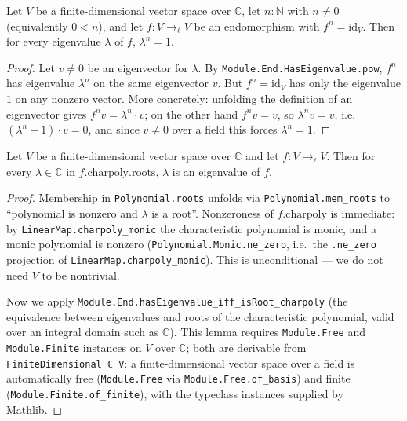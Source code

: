 \begin{lemma}
  \label{lem:eig-root-of-unity}
  \leanok
  Let $V$ be a finite-dimensional vector space over $\mathbb{C}$, let $n : \mathbb{N}$ with $n \neq 0$ (equivalently $0 < n$), and let $f : V \to_{\ell} V$ be an endomorphism with $f^n = \mathrm{id}_V$.  Then for every eigenvalue $\lambda$ of $f$, $\lambda^n = 1$.
\end{lemma}
\begin{proof}
  Let $v \neq 0$ be an eigenvector for $\lambda$.  By \verb|Module.End.HasEigenvalue.pow|, $f^n$ has eigenvalue $\lambda^n$ on the same eigenvector $v$.  But $f^n = \mathrm{id}_V$ has only the eigenvalue $1$ on any nonzero vector.  More concretely: unfolding the definition of an eigenvector gives $f^n v = \lambda^n \cdot v$; on the other hand $f^n v = v$, so $\lambda^n v = v$, i.e.\ $(\lambda^n - 1) \cdot v = 0$, and since $v \neq 0$ over a field this forces $\lambda^n = 1$.
\end{proof}

\begin{lemma}
  \label{lem:charpoly-roots-are-eigenvalues}
  \leanok
  Let $V$ be a finite-dimensional vector space over $\mathbb{C}$ and let $f : V \to_{\ell} V$.  Then for every $\lambda \in \mathbb{C}$ in $f.\mathrm{charpoly}.\mathrm{roots}$, $\lambda$ is an eigenvalue of $f$.
\end{lemma}
\begin{proof}
  Membership in \verb|Polynomial.roots| unfolds via \verb|Polynomial.mem_roots| to ``polynomial is nonzero and $\lambda$ is a root''.  Nonzeroness of $f.\mathrm{charpoly}$ is immediate: by \verb|LinearMap.charpoly_monic| the characteristic polynomial is monic, and a monic polynomial is nonzero (\verb|Polynomial.Monic.ne_zero|, i.e.\ the \verb|.ne_zero| projection of \verb|LinearMap.charpoly_monic|).  This is unconditional --- we do not need $V$ to be nontrivial.

  Now we apply \verb|Module.End.hasEigenvalue_iff_isRoot_charpoly| (the equivalence between eigenvalues and roots of the characteristic polynomial, valid over an integral domain such as $\mathbb{C}$).  This lemma requires \verb|Module.Free| and \verb|Module.Finite| instances on $V$ over $\mathbb{C}$; both are derivable from \verb|FiniteDimensional ℂ V|: a finite-dimensional vector space over a field is automatically free (\verb|Module.Free| via \verb|Module.Free.of_basis|) and finite (\verb|Module.Finite.of_finite|), with the typeclass instances supplied by Mathlib.
\end{proof}

